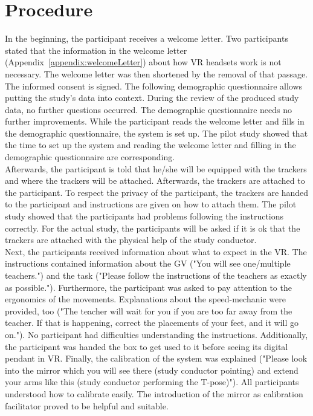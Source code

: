 \section{Procedure}
\label{sec:evalProcedure}
In the beginning, the participant receives a welcome letter. Two participants stated that the information in the welcome letter (Appendix~\ref{appendix:welcomeLetter}) about how VR headsets work is not necessary. The welcome letter was then shortened by the removal of that passage. The informed consent is signed. The following demographic questionnaire allows putting the study's data into context. During the review of the produced study data, no further questions occurred. The demographic questionnaire needs no further improvements. While the participant reads the welcome letter and fills in the demographic questionnaire, the system is set up. The pilot study showed that the time to set up the system and reading the welcome letter and filling in the demographic questionnaire are corresponding.\\
Afterwards, the participant is told that he/she will be equipped with the trackers and where the trackers will be attached. Afterwards, the trackers are attached to the participant. To respect the privacy of the participant, the trackers are handed to the participant and instructions are given on how to attach them. The pilot study showed that the participants had problems following the instructions correctly. For the actual study, the participants will be asked if it is ok that the trackers are attached with the physical help of the study conductor.\\
Next, the participants received information about what to expect in the VR. The instructions contained information about the GV ("You will see one/multiple teachers.") and the task ("Please follow the instructions of the teachers as exactly as possible."). Furthermore, the participant was asked to pay attention to the ergonomics of the movements. Explanations about the speed-mechanic were provided, too ("The teacher will wait for you if you are too far away from the teacher. If that is happening, correct the placements of your feet, and it will go on."). No participant had difficulties understanding the instructions. Additionally, the participant was handed the box to get used to it before seeing its digital pendant in VR. Finally, the calibration of the system was explained ("Please look into the mirror which you will see there (study conductor pointing) and extend your arms like this (study conductor performing the T-pose)"). All participants understood how to calibrate easily. The introduction of the mirror as calibration facilitator proved to be helpful and suitable.\\
